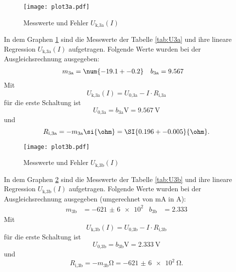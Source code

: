   \newpage

  \begin{figure}[h]
    \texttt{[image: plot3a.pdf]}
    \label{fig:U3a}
    \caption{Messwerte und Fehler $U_\text{k,3a}(I)$}
  \end{figure}

  In dem Graphen \ref{fig:U3a} sind die Messwerte der Tabelle
  \ref{tab:U3a} und ihre lineare Regression
  $U_\text{k,3a}(I)$ aufgetragen.
  Folgende Werte wurden bei der Ausgleichsrechnung ausgegeben:
  \begin{align}
    m_\text{3a} & = \num{-19.1 +- 0.2} & b_\text{3a} & = 9.567
  \end{align}
  Mit
  \begin{equation}
    U_\text{k,3a}(I) = U_\text{0,3a} - I \cdot R_\text{i,3a}
  \end{equation}
  für die erste Schaltung ist
  \begin{equation}
    U_\text{0,3a} = b_\text{3a} \si{\V} = \SI{9.567}{\V}
  \end{equation}
  und
  \begin{equation}
    R_\text{i,3a} = -m_\text{3a} \si{\ohm} = \SI{0.196 +- 0.005}{\ohm}.
  \end{equation}

  \newpage

  \begin{figure}[h]
    \texttt{[image: plot3b.pdf]}
    \label{fig:U3b}
    \caption{Messwerte und Fehler $U_\text{k,3b}(I)$}
  \end{figure}

  In dem Graphen \ref{fig:U3b} sind die Messwerte der Tabelle
  \ref{tab:U3b} und ihre lineare Regression
  $U_\text{k,3b}(I)$ aufgetragen.
  Folgende Werte wurden bei der Ausgleichsrechnung ausgegeben (umgerechnet von
  \si{\milli\A} in \si{\A}):
  \begin{align}
    m_\text{3b} & = \num{-621(6)e2} & b_\text{3b} & = 2.333
  \end{align}
  Mit
  \begin{equation}
    U_\text{k,3b}(I) = U_\text{0,3b} - I \cdot R_\text{i,3b}
  \end{equation}
  für die erste Schaltung ist
  \begin{equation}
    U_\text{0,3b} = b_\text{3b} \si{\V} = \SI{2.333}{\V}
  \end{equation}
  und
  \begin{equation}
    R_\text{i,3b} = -m_\text{3b} \si{\ohm} = \SI{-621(6)e2}{\ohm}.
  \end{equation}

